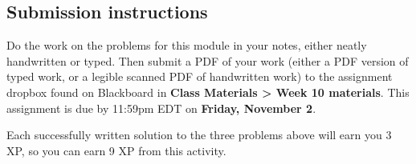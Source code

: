 \documentclass[11pt]{article}
\begin{document}
\vspace{0.5in}

\subsection*{Submission instructions}

Do the work on the problems for this module in your notes, either neatly handwritten or typed. Then submit a PDF of your work (either a PDF version of typed work, or a legible scanned PDF of handwritten work) to the assignment dropbox found on Blackboard in \textbf{Class Materials > Week 10 materials}. This assignment is due by 11:59pm EDT on \textbf{Friday, November 2}. 

Each successfully written solution to the three problems above will earn you 3 XP, so you can earn 9 XP from this activity. 
\end{document}
